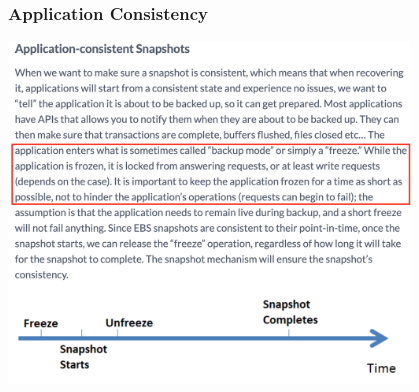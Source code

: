 \documentclass[UTF8,8pt,xcolor=dvipsnames]{beamer}
\begin{document}
\begin{frame}[fragile]
    \frametitle{Application Consistency}
    \begin{center}
        \includegraphics[width=0.8\textwidth]{../imgs/application-consistency.png}
    \end{center}
\end{frame}
\end{document}
